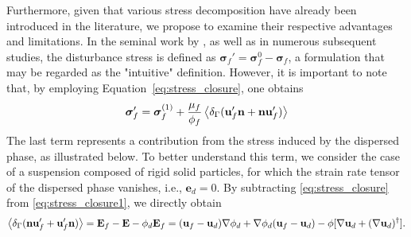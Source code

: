 Furthermore, given that various stress decomposition have already been introduced in the literature, we propose to examine their respective advantages and limitations. 
In the seminal work by \citet{zhang1997momentum}, as well as in numerous subsequent studies, the disturbance stress is defined as $\bm\sigma_f' = \bm\sigma_f^0 - \bm\sigma_f$, a formulation that may be regarded as the "intuitive" definition. 
However, it is important to note that, by employing Equation~\ref{eq:stress_closure}, one obtains
\begin{equation}
    \bm\sigma_f'
    = \bm \sigma _f ^{(1)}
    + \frac{\mu_f}{\phi_f} \avg{\delta_\Gamma( \textbf{u}_f'  \textbf{n} +  \textbf{n} \textbf{u}_f' )}
    \label{eq:stress_closure_zhang}
\end{equation}
The last term represents a contribution from the stress induced by the dispersed phase, as illustrated below. 
To better understand this term, we consider the case of a suspension composed of rigid solid particles, for which the strain rate tensor of the dispersed phase vanishes, i.e., $\textbf{e}_d = 0$.
By subtracting \ref{eq:stress_closure} from \ref{eq:stress_closure1}, we directly obtain
\begin{equation}
    \left<\delta_\Gamma (\textbf{n} \textbf{u}_f'+  \textbf{u}_f' \textbf{n})\right>
    = \textbf{E}_f - \textbf{E}
    - \phi_d \textbf{E}_f 
    =
    (\textbf{u}_f - \textbf{u}_d)\mathbf{\nabla} \phi_d + \mathbf{\nabla} \phi_d (\textbf{u}_f - \textbf{u}_d)   
    -  \phi [\mathbf{\nabla} \textbf{u}_d+ (\mathbf{\nabla} \textbf{u}_d)^\dagger ]. 
\end{equation} 

